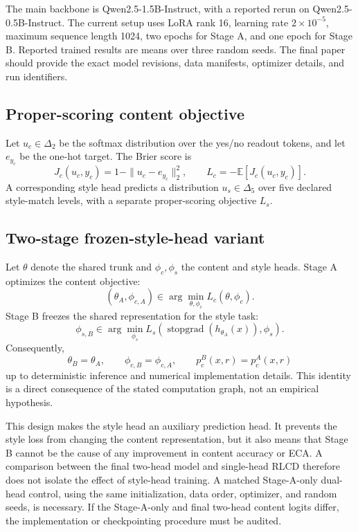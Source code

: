 \documentclass[letterpaper]{article} %
\begin{document}
The main backbone is Qwen2.5-1.5B-Instruct, with a reported rerun on Qwen2.5-0.5B-Instruct. The current setup uses LoRA rank 16, learning rate $2\times10^{-5}$, maximum sequence length 1024, two epochs for Stage A, and one epoch for Stage B. Reported trained results are means over three random seeds. The final paper should provide the exact model revisions, data manifests, optimizer details, and run identifiers.

\subsection{Proper-scoring content objective}

Let $u_c\in\Delta_2$ be the softmax distribution over the yes/no readout tokens, and let $e_{y_c}$ be the one-hot target. The Brier score is
\begin{equation}
J_c(u_c,y_c)=1-\|u_c-e_{y_c}\|_2^2,
\qquad
L_c=-\mathbb{E}[J_c(u_c,y_c)].
\label{eq:content-brier}
\end{equation}
A corresponding style head predicts a distribution $u_s\in\Delta_5$ over five declared style-match levels, with a separate proper-scoring objective $L_s$.

\subsection{Two-stage frozen-style-head variant}

Let $\theta$ denote the shared trunk and $\phi_c,\phi_s$ the content and style heads. Stage A optimizes the content objective:
\begin{equation}
(\theta_A,\phi_{c,A})
\in
\arg\min_{\theta,\phi_c} L_c(\theta,\phi_c).
\label{eq:stage-a}
\end{equation}
Stage B freezes the shared representation for the style task:
\begin{equation}
\phi_{s,B}
\in
\arg\min_{\phi_s}
L_s(\operatorname{stopgrad}(h_{\theta_A}(x)),\phi_s).
\label{eq:stage-b}
\end{equation}
Consequently,
\begin{equation}
\theta_B=\theta_A,\qquad
\phi_{c,B}=\phi_{c,A},\qquad
p_c^{B}(x,r)=p_c^{A}(x,r)
\label{eq:freeze-identity}
\end{equation}
up to deterministic inference and numerical implementation details. This identity is a direct consequence of the stated computation graph, not an empirical hypothesis.

This design makes the style head an auxiliary prediction head. It prevents the style loss from changing the content representation, but it also means that Stage B cannot be the cause of any improvement in content accuracy or ECA. A comparison between the final two-head model and single-head RLCD therefore does not isolate the effect of style-head training. A matched Stage-A-only dual-head control, using the same initialization, data order, optimizer, and random seeds, is necessary. If the Stage-A-only and final two-head content logits differ, the implementation or checkpointing procedure must be audited.
\end{document}
